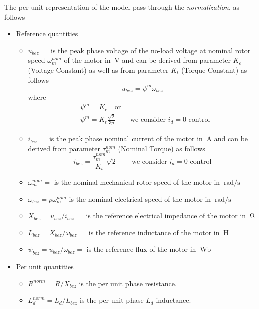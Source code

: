 \documentclass[12pt,a4paper]{scrartcl}
\begin{document}
\begin{onehalfspace}
The per unit representation of the model pass through the \textit{normalization}, as follows
\begin{itemize}
	\item[--] Reference quantities
	\begin{itemize}
		\item[--] $u_{bez} = $ is the peak phase voltage of the no-load voltage at nominal rotor speed $\omega_m^{nom}$ of the motor in $\SI{}{\volt}$ and can be derived from parameter $K_e$ (Voltage Constant) as well as from parameter $K_t$ (Torque Constant) as follows
		\begin{equation}
			u_{bez} = \psi^m\omega_{bez} 
		\end{equation}
	where
		\begin{equation}
			\begin{aligned}
			& \psi^m = K_e\quad \text{or} \\[6pt]
			& \psi^m = K_t\frac{\sqrt{2}}{3p} \qquad\text{we consider $i_d=0$ control}
			\end{aligned}
		\end{equation}
		\item[--] $i_{bez} = $ is the peak phase nominal current of the motor in $\SI{}{\ampere}$ and can be derived from parameter $\tau_m^{nom}$ (Nominal Torque) as follows
		\begin{equation}
			i_{bez} = \frac{\tau_m^{nom}}{K_t}\sqrt{2} \qquad\text{we consider $i_d=0$ control}
		\end{equation}
		\item[--] $\omega_m^{nom} = $ is the nominal mechanical rotor speed of the motor in $\SI{}{\radian\per\second}$
		\item[--] $\omega_{bez} = p \omega_m^{nom}$ is the nominal electrical speed of the motor in $\SI{}{\radian\per\second}$
		\item[--] $X_{bez} = u_{bez}/i_{bez} = $ is the reference electrical impedance of the motor in $\SI{}{\ohm}$
		\item[--] $L_{bez} = X_{bez}/\omega_{bez} = $ is the reference inductance of the motor in $\SI{}{\henry}$	
		\item[--] $\psi_{bez} = u_{bez}/\omega_{bez} = $ is the reference flux of the motor in $\SI{}{\weber}$
	\end{itemize}
	\item[--] Per unit quantities
		\begin{itemize}
		\item[--] $R^{norm} = R/X_{bez}$ is the per unit phase resistance.
		\item[--] $L_d^{norm} = L_d/L_{bez}$ is the per unit phase $L_d$ inductance.

\end{itemize}
\end{itemize}
\end{onehalfspace}
\end{document}
